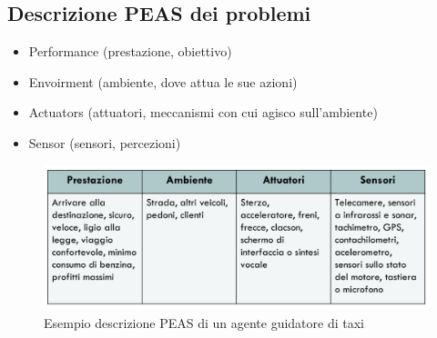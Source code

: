 \documentclass{article}
\begin{document}
\subsection{Descrizione PEAS dei problemi}
\begin{itemize}
    \item Performance (prestazione, obiettivo)
    \item Envoirment (ambiente, dove attua le sue azioni)
    \item Actuators (attuatori, meccanismi con cui agisco sull'ambiente)
    \item Sensor (sensori, percezioni)
\end{itemize}
\begin{figure}[H]
    \centering
    \includegraphics[scale=0.4]{Images/esempioPEAS.png}
    \caption{Esempio descrizione PEAS di un agente guidatore di taxi}
\end{figure}
\clearpage
\end{document}
